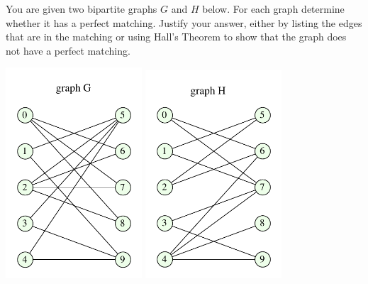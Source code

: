 \documentclass[11pt]{article}
\begin{document}

\medskip


\lineacross


\begin{problem}
	You are given two bipartite graphs $G$ and $H$ below. For each
graph determine whether it has a perfect matching.
Justify your answer, either by
listing the edges that are in the matching or using
Hall's Theorem to show that the graph does not have a
perfect matching.

\begin{center}
\includegraphics[width = 2in]{bipartite_graphG_hw5.pdf}
\includegraphics[width = 2in]{bipartite_graphH_hw5.pdf}
\end{center}
\end{problem}
\end{document}
